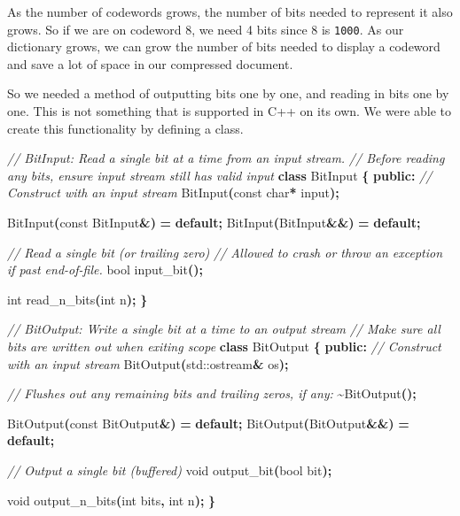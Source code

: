 \documentclass[12pt,twoside]{reedthesis}
\newenvironment{Shaded}{\begin{snugshade}}{\end{snugshade}}
\newcommand{\AttributeTok}[1]{\textcolor[rgb]{0.77,0.63,0.00}{#1}}
\newcommand{\BuiltInTok}[1]{#1}
\newcommand{\CommentTok}[1]{\textcolor[rgb]{0.56,0.35,0.01}{\textit{#1}}}
\newcommand{\ControlFlowTok}[1]{\textcolor[rgb]{0.13,0.29,0.53}{\textbf{#1}}}
\newcommand{\DataTypeTok}[1]{\textcolor[rgb]{0.13,0.29,0.53}{#1}}
\newcommand{\KeywordTok}[1]{\textcolor[rgb]{0.13,0.29,0.53}{\textbf{#1}}}
\newcommand{\NormalTok}[1]{#1}
\newcommand{\OperatorTok}[1]{\textcolor[rgb]{0.81,0.36,0.00}{\textbf{#1}}}
\begin{document}
As the number of codewords grows, the number of bits needed to represent it also grows. So if we are on codeword 8, we need 4 bits since 8 is \texttt{1000}. As our dictionary grows, we can grow the number of bits needed to display a codeword and save a lot of space in our compressed document.

So we needed a method of outputting bits one by one, and reading in bits one by one. This is not something that is supported in C++ on its own. We were able to create this functionality by defining a class.
\begin{Shaded}
\begin{Highlighting}[]
\CommentTok{// BitInput: Read a single bit at a time from an input stream.}
\CommentTok{// Before reading any bits, ensure input stream still has valid input}
\KeywordTok{class}\NormalTok{ BitInput }\OperatorTok{\{}
 \KeywordTok{public}\OperatorTok{:}
  \CommentTok{// Construct with an input stream}
\NormalTok{  BitInput}\OperatorTok{(}\AttributeTok{const} \DataTypeTok{char}\OperatorTok{*}\NormalTok{ input}\OperatorTok{);}

\NormalTok{  BitInput}\OperatorTok{(}\AttributeTok{const}\NormalTok{ BitInput}\OperatorTok{\&)} \OperatorTok{=} \ControlFlowTok{default}\OperatorTok{;}
\NormalTok{  BitInput}\OperatorTok{(}\NormalTok{BitInput}\OperatorTok{\&\&)} \OperatorTok{=} \ControlFlowTok{default}\OperatorTok{;}

  \CommentTok{// Read a single bit (or trailing zero)}
  \CommentTok{// Allowed to crash or throw an exception if past end{-}of{-}file.}
  \DataTypeTok{bool}\NormalTok{ input\_bit}\OperatorTok{();}

  \DataTypeTok{int}\NormalTok{ read\_n\_bits}\OperatorTok{(}\DataTypeTok{int}\NormalTok{ n}\OperatorTok{);}
\OperatorTok{\}}

\CommentTok{// BitOutput: Write a single bit at a time to an output stream}
\CommentTok{// Make sure all bits are written out when exiting scope}
\KeywordTok{class}\NormalTok{ BitOutput }\OperatorTok{\{}
 \KeywordTok{public}\OperatorTok{:}
  \CommentTok{// Construct with an input stream}
\NormalTok{  BitOutput}\OperatorTok{(}\BuiltInTok{std::}\NormalTok{ostream}\OperatorTok{\&}\NormalTok{ os}\OperatorTok{);}

  \CommentTok{// Flushes out any remaining bits and trailing zeros, if any:}
  \OperatorTok{\textasciitilde{}}\NormalTok{BitOutput}\OperatorTok{();}

\NormalTok{  BitOutput}\OperatorTok{(}\AttributeTok{const}\NormalTok{ BitOutput}\OperatorTok{\&)} \OperatorTok{=} \ControlFlowTok{default}\OperatorTok{;}
\NormalTok{  BitOutput}\OperatorTok{(}\NormalTok{BitOutput}\OperatorTok{\&\&)} \OperatorTok{=} \ControlFlowTok{default}\OperatorTok{;}

  \CommentTok{// Output a single bit (buffered)}
  \DataTypeTok{void}\NormalTok{ output\_bit}\OperatorTok{(}\DataTypeTok{bool}\NormalTok{ bit}\OperatorTok{);}

  \DataTypeTok{void}\NormalTok{ output\_n\_bits}\OperatorTok{(}\DataTypeTok{int}\NormalTok{ bits}\OperatorTok{,} \DataTypeTok{int}\NormalTok{ n}\OperatorTok{);}
\OperatorTok{\}}
\end{Highlighting}
\end{Shaded}
\end{document}
